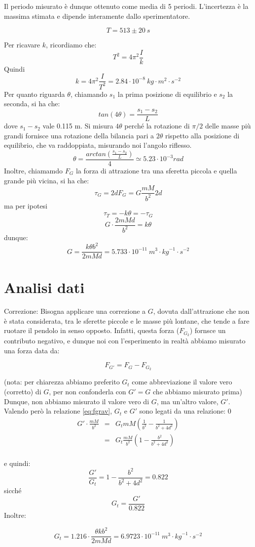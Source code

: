 Il periodo misurato è dunque ottenuto come media di 5 periodi. L'incertezza è la massima stimata e dipende interamente dallo sperimentatore.

$$T = 513 \pm 20 \ s$$

Per ricavare $k$, ricordiamo che:
$$T^2 = 4 \pi^2 \frac{I}{k}$$
Quindi
$$k = 4 \pi^2 \frac{I}{T^2} = 2.84 \cdot 10^{-8}\ kg\cdot m^2\cdot{s}^{-2}$$
Per quanto riguarda $\theta$, chiamando $s_1$ la prima posizione di equilibrio e $s_2$ la seconda, si ha che:
$$ tan(4\theta) = \frac{s_1-s_2}{L} $$
dove $s_1-s_2$ vale 0.115 m. Si misura $4\theta$ perché la rotazione di $\pi/2$ delle masse più grandi fornisce una rotazione della bilancia pari a $2\theta$ rispetto alla posizione di equilibrio, che va raddoppiata, misurando noi l'angolo riflesso.
$$ \theta = \frac{arctan(\frac{s_1-s_2}{L})}{4} \simeq 5.23 \cdot 10^{-3} rad $$
Inoltre, chiamamdo $F_G$ la forza di attrazione tra una sferetta piccola e quella grande più vicina, si ha che:
$$ \tau_G = 2dF_G = G\frac{mM}{b^2}2d $$
ma per ipotesi
$$ \tau_T = -k\theta = -\tau_G $$
$$ G\cdot\frac{2mMd}{b^2} = k\theta $$
dunque:
$$G = \frac{k \theta b^2}{2mMd} = 5.733 \cdot 10^{-11}\ {m}^3\cdot {kg}^{-1}\cdot{s}^{-2}$$

\section{Analisi dati} 

Correzione:
Bisogna applicare una correzione a $G$, dovuta dall'attrazione che non è stata considerata, tra le sferette piccole e le masse più lontane, che tende a fare ruotare il pendolo in senso opposto. Infatti, questa forza ($F_{G_2}$) fornsce un contributo negativo, e dunque noi con l'esperimento in realtà abbiamo misurato una forza data da:

\begin{equation}\label{eq:fgrav}
 F_{G'} = F_G - F_{G_2}
\end{equation}

(nota: per chiarezza abbiamo preferito $G_t$ come abbreviazione il valore vero (corretto) di $G$, per non confonderla con $G'=G$ che abbiamo misurato prima)
Dunque, non abbiamo misurato il valore vero di $G$, ma un'altro valore, $G'$. Valendo però la relazione \ref{eq:fgrav}, $G_t$ e $G'$ sono legati da una relazione:
0
\begin{eqnarray*}
G'\cdot\frac{mM}{b^2} & = & G_tmM(\frac{1}{b^2} - \frac{1}{b^2+4d^2}) \\
                      & = & G_t\frac{mM}{b^2}(1 - \frac{b^2}{b^2+4d^2}) \\
\end{eqnarray*}

e quindi:
$$ \frac{G'}{G_t} = 1-\frac{b^2}{b^2+4d^2} = 0.822$$
sicché
$$ G_t = \frac{G'}{0.822}$$
Inoltre:

$$ G_t = 1.216\cdot \frac{\theta k b^2}{2mMd} = 6.9723\cdot 10^{-11}\ {m}^3\cdot {kg}^{-1}\cdot{s}^{-2}$$

